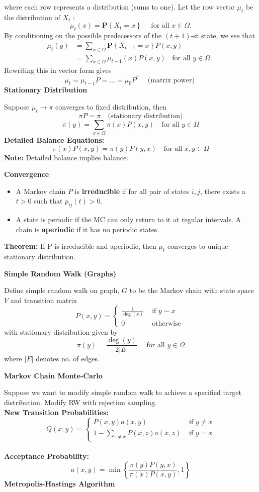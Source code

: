 \documentclass[a4paper]{article}
\newcommand{\subheading}[1]{{\scriptsize\textbf{#1}}}
\begin{document}
\begin{multicols*}{4}
where each row represents a distribution (sums to one). Let  the row vector $\mu_t$ be the distribution of $X_t$ :
$$
\mu_t(x)=\mathbf{P}\left\{X_t=x\right\} \quad \text { for all } x \in \Omega .
$$
By conditioning on the possible predecessors of the $(t+1)$-st state, we see that
$$
\begin{aligned}
\mu_{t}(y)&=\sum_{x \in \Omega} \mathbf{P}\left\{X_{t-1}=x\right\} P(x, y)\\
&=\sum_{x \in \Omega} \mu_{t-1}(x) P(x, y) \;\; \text { for all } y \in \Omega \text {. }
\end{aligned}
$$
Rewriting this in vector form gives
$$
\mu_{t}=\mu_{t-1} P =\dots= \mu_0 P^t \quad \text { (matrix power) }
$$
\subheading{Stationary Distribution}

Suppose $\mu_t \rightarrow \pi$ converges to fixed distribution, then $$\pi P = \pi \quad \text{(stationary distribution)}$$
$$
\pi(y)=\sum_{x \in \Omega} \pi(x) P(x, y) \quad \text{for all} \; y \in \Omega
$$
\textbf{Detailed Balance Equations:}
$$
\pi(x) P(x, y)=\pi(y) P(y, x) \quad \text{for all }x, y \in \Omega
$$
\textbf{Note:} Detailed balance implies balance. 

\subheading{Convergence}
\begin{itemize}
    \item A Markov chain $P$ is \textbf{irreducible} if for all pair of states $i, j$, there exists a $t>0$ such that $p_{i j}(t)>0$.
    \item A state is periodic if the MC can only return to it at regular intervals. A chain is \textbf{aperiodic} if it has no periodic states.
\end{itemize}
\textbf{Theorem:} If P is irreducible and aperiodic, then $\mu_t$ converges to unique stationary distribution.
\smallskip

\subheading{Simple Random Walk (Graphs)}

Define simple random walk on graph, $G$ to be the Markov chain with state space $V$ and transition matrix
$$
P(x, y)= \begin{cases}\frac{1}{\operatorname{deg}(x)} & \text { if } y \sim x \\ 0 & \text { otherwise }\end{cases}
$$
with stationary distribution given by
$$
\pi(y)=\frac{\operatorname{deg}(y)}{2|E|} \quad \text { for all } y \in \Omega
$$
where $|E|$ denotes no. of edges.
\smallskip
\hline
\smallskip

\subheading{Markov Chain Monte-Carlo}

Suppose we want to modify simple random walk to achieve a specified target distribution. Modify RW with rejection sampling.
\\
\textbf{New Transition Probabilities:}
$$
Q(x, y)= \begin{cases}P(x, y) a(x, y) & \text { if } y \neq x \\ 1-\sum_{z \neq x} P(x, z) a(x, z) & \text { if } y=x\end{cases}
$$
\\
\textbf{Acceptance Probability:}
$$a(x, y)=\min \left\{\frac{\pi(y) P(y, x)}{\pi(x) P(x, y)}, 1\right\}$$
\subheading{Metropolis-Hastings Algorithm }


\end{multicols*}
\end{document}
